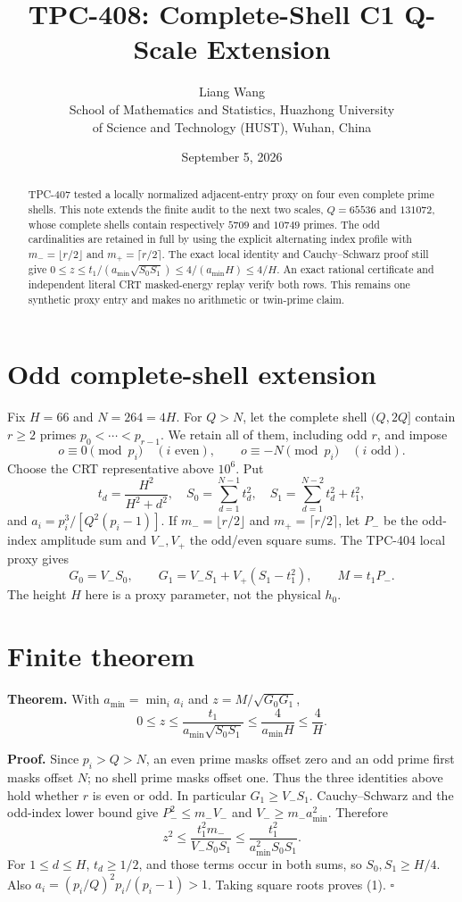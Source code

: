 \documentclass[11pt]{article}
\title{TPC-408: Complete-Shell C1 Q-Scale Extension}
\author{Liang Wang\\School of Mathematics and Statistics, Huazhong University\\of Science and Technology (HUST), Wuhan, China}
\date{September 5, 2026}
\begin{document}
\maketitle

\begin{abstract}
TPC-407 tested a locally normalized adjacent-entry proxy on four even
complete prime shells.  This note extends the finite audit to the next two
scales, $Q=65536$ and $131072$, whose complete shells contain respectively
$5709$ and $10749$ primes.  The odd cardinalities are retained in full by
using the explicit alternating index profile with
$m_- = \lfloor r/2\rfloor$ and $m_+=\lceil r/2\rceil$.  The exact local
identity and Cauchy--Schwarz proof still give
$0\le z\le t_1/(a_{\min}\sqrt{S_0S_1})\le4/(a_{\min}H)\le4/H$.
An exact rational certificate and independent literal CRT masked-energy
replay verify both rows.  This remains one synthetic proxy entry and makes
no arithmetic or twin-prime claim.
\end{abstract}

\section{Odd complete-shell extension}
Fix $H=66$ and $N=264=4H$.  For $Q>N$, let the complete shell
$(Q,2Q]$ contain $r\ge2$ primes $p_0<\cdots<p_{r-1}$.  We retain all of
them, including odd $r$, and impose
\[
 o\equiv0\pmod {p_i}\quad(i\text{ even}),\qquad
 o\equiv-N\pmod {p_i}\quad(i\text{ odd}).
\]
Choose the CRT representative above $10^6$.  Put
\[
 t_d=\frac{H^2}{H^2+d^2},\quad S_0=\sum_{d=1}^{N-1}t_d^2,
 \quad S_1=\sum_{d=1}^{N-2}t_d^2+t_1^2,
\]
and $a_i=p_i^3/[Q^2(p_i-1)]$.  If $m_-=\lfloor r/2\rfloor$ and
$m_+=\lceil r/2\rceil$, let $P_-$ be the odd-index amplitude sum and
$V_-,V_+$ the odd/even square sums.  The TPC-404 local proxy gives
\[
 G_0=V_-S_0,\qquad G_1=V_-S_1+V_+(S_1-t_1^2),\qquad M=t_1P_-.
\]
The height $H$ here is a proxy parameter, not the physical $h_0$.

\section{Finite theorem}
\textbf{Theorem.} With $a_{\min}=\min_i a_i$ and
$z=M/\sqrt{G_0G_1}$,
\[
 0\le z\le\frac{t_1}{a_{\min}\sqrt{S_0S_1}}
 \le\frac4{a_{\min}H}\le\frac4H. \tag{1}
\]

\textbf{Proof.} Since $p_i>Q>N$, an even prime masks offset zero and an
odd prime first masks offset $N$; no shell prime masks offset one.  Thus the
three identities above hold whether $r$ is even or odd.  In particular
$G_1\ge V_-S_1$.  Cauchy--Schwarz and the odd-index lower bound give
$P_-^2\le m_-V_-$ and $V_-\ge m_-a_{\min}^2$.  Therefore
\[
 z^2\le\frac{t_1^2m_-}{V_-S_0S_1}
 \le\frac{t_1^2}{a_{\min}^2S_0S_1}.
\]
For $1\le d\le H$, $t_d\ge1/2$, and those terms occur in both sums, so
$S_0,S_1\ge H/4$.  Also
$a_i=(p_i/Q)^2p_i/(p_i-1)>1$.  Taking square roots proves (1). \hfill$\square$
\end{document}
